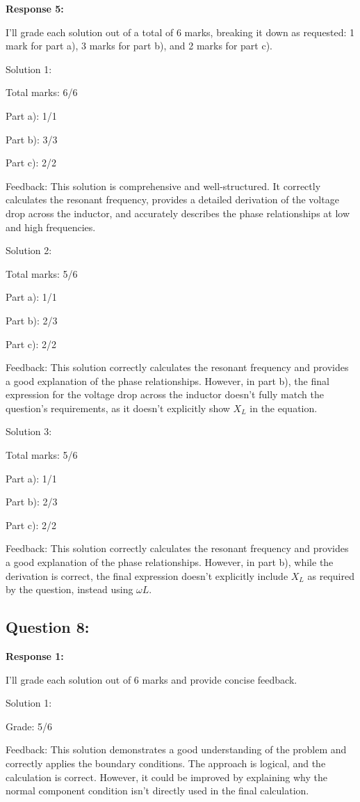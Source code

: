 \documentclass[a4paper,11pt]{article}
\begin{document}
\bigskip
\textbf{Response 5:}

I'll grade each solution out of a total of 6 marks, breaking it down as requested: 1 mark for part a), 3 marks for part b), and 2 marks for part c).

Solution 1:

Total marks: 6/6

Part a): 1/1

Part b): 3/3

Part c): 2/2

Feedback: This solution is comprehensive and well-structured. It correctly calculates the resonant frequency, provides a detailed derivation of the voltage drop across the inductor, and accurately describes the phase relationships at low and high frequencies.

Solution 2:

Total marks: 5/6

Part a): 1/1

Part b): 2/3

Part c): 2/2

Feedback: This solution correctly calculates the resonant frequency and provides a good explanation of the phase relationships. However, in part b), the final expression for the voltage drop across the inductor doesn't fully match the question's requirements, as it doesn't explicitly show \(X_L\) in the equation.

Solution 3:

Total marks: 5/6

Part a): 1/1

Part b): 2/3

Part c): 2/2

Feedback: This solution correctly calculates the resonant frequency and provides a good explanation of the phase relationships. However, in part b), while the derivation is correct, the final expression doesn't explicitly include \(X_L\) as required by the question, instead using \(\omega L\).


\subsection*{Question 8:}

\textbf{Response 1:}

I'll grade each solution out of 6 marks and provide concise feedback.

Solution 1:

Grade: 5/6

Feedback: This solution demonstrates a good understanding of the problem and correctly applies the boundary conditions. The approach is logical, and the calculation is correct. However, it could be improved by explaining why the normal component condition isn't directly used in the final calculation.
\end{document}
